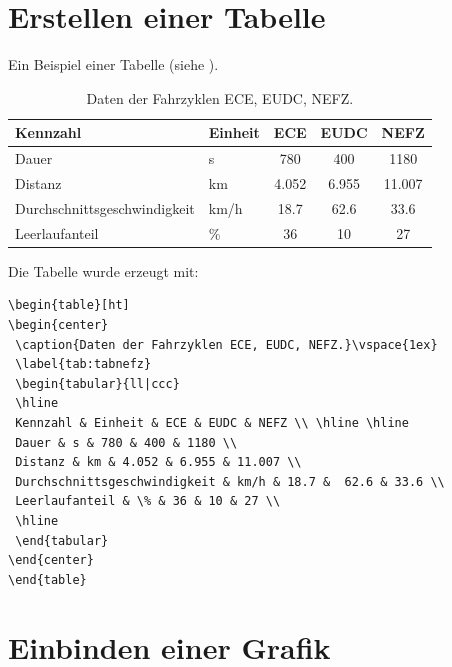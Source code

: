 \section{Erstellen einer Tabelle}\label{sec:tabellen}

Ein Beispiel einer Tabelle (siehe ).
\begin{table}[ht]
\begin{center}
 \caption{Daten der Fahrzyklen ECE, EUDC, NEFZ.}\vspace{1ex}
 \label{tab:tabnefz}
 \begin{tabular}{ll|ccc}
 \hline
 Kennzahl & Einheit & ECE & EUDC & NEFZ \\ \hline \hline
 Dauer & s & 780 & 400 & 1180 \\
 Distanz & km & 4.052 & 6.955 & 11.007 \\
 Durchschnittsgeschwindigkeit & km/h & 18.7 &  62.6 & 33.6 \\
 Leerlaufanteil & \% & 36 & 10 & 27 \\
 \hline
 \end{tabular}
\end{center}
\end{table}

Die Tabelle wurde erzeugt mit:
\begin{verbatim}
\begin{table}[ht]
\begin{center}
 \caption{Daten der Fahrzyklen ECE, EUDC, NEFZ.}\vspace{1ex}
 \label{tab:tabnefz}
 \begin{tabular}{ll|ccc}
 \hline
 Kennzahl & Einheit & ECE & EUDC & NEFZ \\ \hline \hline
 Dauer & s & 780 & 400 & 1180 \\
 Distanz & km & 4.052 & 6.955 & 11.007 \\
 Durchschnittsgeschwindigkeit & km/h & 18.7 &  62.6 & 33.6 \\
 Leerlaufanteil & \% & 36 & 10 & 27 \\
 \hline
 \end{tabular}
\end{center}
\end{table}
\end{verbatim}


\section{Einbinden einer Grafik}\label{sec:epsgraph}

